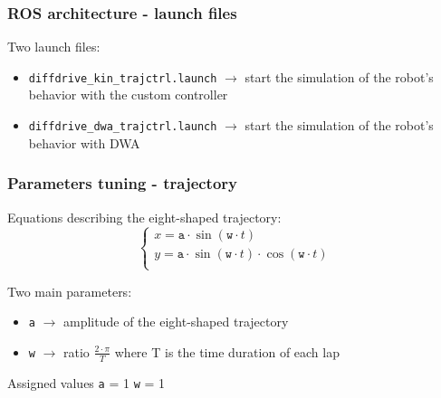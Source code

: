 \documentclass{beamer}
\begin{document}
\begin{frame}
\frametitle{ROS architecture - launch files}

Two launch files:
\begin{itemize}
  \item \texttt{diffdrive\_kin\_trajctrl.launch} $\rightarrow$ start the simulation of the robot's behavior with the custom controller
  \item \texttt{diffdrive\_dwa\_trajctrl.launch} $\rightarrow$ start the simulation of the robot's behavior with DWA
\end{itemize}


\end{frame}


\begin{frame}
\frametitle{Parameters tuning - trajectory}

Equations describing the eight-shaped trajectory:
$$
\begin{cases}
    x = \texttt{a} \cdot \sin (\texttt{w} \cdot t)\\
    y = \texttt{a} \cdot \sin (\texttt{w} \cdot t)\cdot \cos (\texttt{w} \cdot t)\\
\end{cases}
$$

\vspace{1em}

Two main parameters:
\begin{itemize}
 \item \texttt{a} $\rightarrow$ amplitude of the eight-shaped trajectory
 \item \texttt{w} $\rightarrow$ ratio $\frac{2 \cdot \pi}{T}$ where T is the time duration of each lap
\end{itemize}

\vspace{1em}

\begin{block}{Assigned values}
\centering
\texttt{a} = 1
\hspace{3em}
\texttt{w} = 1
\end{block}

\end{frame}

\end{document}
